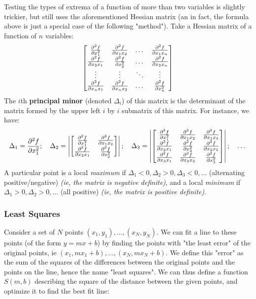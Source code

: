\documentclass[12pt]{article}
\begin{document}
{Testing the types of extrema of a function of more than two variables is slightly trickier, but still uses the aforementioned Hessian matrix (an in fact, the formula above is just a special case of the following "method"). Take a Hessian matrix of a function of $n$ variables: \[\begin{bmatrix}
    \frac{\partial ^2f}{\partial x_1^2} & \frac{\partial ^2f}{\partial x_1x_2} & \dots & \frac{\partial ^2f}{\partial x_1x_n}\\
    \frac{\partial ^2f}{\partial x_2x_1} & \frac{\partial ^2f}{\partial x_2^2} & \dots & \frac{\partial ^2f}{\partial x_2x_n}\\
    \vdots & \vdots & \ddots & \vdots\\
    \frac{\partial ^2f}{\partial x_nx_1} & \frac{\partial ^2f}{\partial x_nx_2} & \dots & \frac{\partial ^2f}{\partial x_n^2}
\end{bmatrix}\]
The $i$th \textbf{principal minor} (denoted $\Delta_i$) of this matrix is the determinant of the matrix formed by the upper left $i$ by $i$ submatrix of this matrix. For instance, we have: \[\Delta_1 = \frac{\partial ^2f}{\partial x_1^2}; \quad \Delta_2 = \left|\begin{bmatrix}
    \frac{\partial ^2f}{\partial x_1^2} & \frac{\partial ^2f}{\partial x_1x_2}\\
    \frac{\partial ^2f}{\partial x_2x_1} & \frac{\partial ^2f}{\partial x_2^2}
\end{bmatrix}\right|; \quad \Delta_3 = \left|\begin{bmatrix}
    \frac{\partial ^2f}{\partial x_1^2} & \frac{\partial ^2f}{\partial x_1x_2} & \frac{\partial ^2f}{\partial x_1x_3}\\
    \frac{\partial ^2f}{\partial x_2x_1} & \frac{\partial ^2f}{\partial x_2^2} & \frac{\partial ^2f}{\partial x_2x_3}\\
    \frac{\partial ^2f}{\partial x_3x_1} & \frac{\partial ^2f}{\partial x_3x_2} & \frac{\partial ^2f}{\partial x_3^2}
\end{bmatrix}\right|; \quad \dots\] A particular point is a local \textit{maximum} if $\Delta_1 < 0, \Delta_2 > 0, \Delta_3 < 0, \dots$ (alternating positive/negative) \textit{(ie, the matrix is negative definite)}, and a local \textit{minimum} if $\Delta_1 >0, \Delta_2>0, \dots$ (all positive) \textit{(ie, the matrix is positive definite)}.
\subsubsection{Least Squares}

Consider a set of $N$ points $(x_1, y_1), \dots, (x_N, y_N)$. We can fit a line to these points (of the form $y = mx+b$) by finding the points with "the least error" of the original points, ie $(x_1, mx_1+b), \dots, (x_N, mx_N+b)$. We define this "error" as the sum of the squares of the differences between the original points and the points on the line, hence the name "least squares". We can thus define a function $S(m,b)$ describing the square of the distance between the given points, and optimize it to find the best fit line:

}
\end{document}
